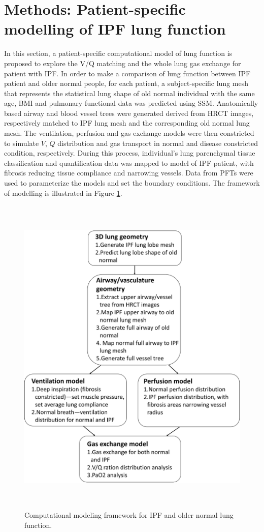 \section{Methods: Patient-specific modelling of IPF lung function}
In this section, a patient-specific computational model of lung function is proposed to explore the V/Q matching and the whole lung gas exchange for patient with IPF. In order to make a comparison of lung function between IPF patient and older normal people, for each patient, a subject-specific lung mesh that represents the statistical lung shape of old normal individual with the same age, BMI and pulmonary functional data was predicted using SSM. Anatomically based airway and blood vessel trees were generated derived from HRCT images, respectively matched to IPF lung mesh and the corresponding old normal lung mesh. The ventilation, perfusion and gas exchange models were then constricted to simulate $\dot{V}$, $\dot{Q}$ distribution and gas transport in normal and disease constricted condition, respectively. During this process, individual's lung parenchymal tissue classification and quantification data was mapped to model of IPF patient, with fibrosis reducing tissue compliance and narrowing vessels. Data from PFTs were used to parameterize the models and set the boundary conditions. The framework of modelling is illustrated in Figure \ref{fig:WholeFramework}. 

\begin{figure}[htbp]
  \centering 
  \includegraphics[height=6.2in]{ModelBasedAnalysis/Image/WholeFramework.png}
  \caption{Computational modeling framework for IPF and older normal lung function. }
  \label{fig:WholeFramework}
\end{figure}

